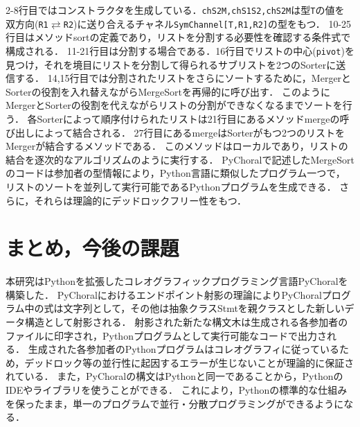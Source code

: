 \documentclass{thesis}
\begin{document}
2-8行目ではコンストラクタを生成している．\texttt{chS2M,chS1S2,chS2M}は型\texttt{T}の値を
双方向(\texttt{R1}$\rightleftarrows$\texttt{R2})に送り合えるチャネル\texttt{SymChannel[T,R1,R2]}の型をもつ．
10-25行目はメソッド\textsf{sort}の定義であり，リストを分割する必要性を確認する条件式で構成される．
11-21行目は分割する場合である．16行目でリストの中心(\texttt{pivot})を見つけ，それを境目にリストを分割して得られるサブリストを2つのSorterに送信する．
14,15行目では分割されたリストをさらにソートするために，MergerとSorterの役割を入れ替えながらMergeSortを再帰的に呼び出す．
このようにMergerとSorterの役割を代えながらリストの分割ができなくなるまでソートを行う．
各Sorterによって順序付けられたリストは21行目にあるメソッド\textsf{merge}の呼び出しによって結合される．
27行目にある\textsf{merge}はSorterがもつ2つのリストをMergerが結合するメソッドである．
このメソッドはローカルであり，リストの結合を逐次的なアルゴリズムのように実行する．
PyChoralで記述したMergeSortのコードは参加者の型情報により，Python言語に類似したプログラム一つで，リストのソートを並列して実行可能であるPythonプログラムを生成できる．
さらに，それらは理論的にデッドロックフリー性をもつ．

%
    

\chapter{まとめ，今後の課題}
本研究はPythonを拡張したコレオグラフィックプログラミング言語PyChoralを構築した．
PyChoralにおけるエンドポイント射影の理論によりPyChoralプログラム中の式は文字列として，その他は抽象クラス\textsf{Stmt}を親クラスとした新しいデータ構造として射影される．
射影された新たな構文木は生成される各参加者のファイルに印字され，Pythonプログラムとして実行可能なコードで出力される．
生成された各参加者のPythonプログラムはコレオグラフィに従っているため，デッドロック等の並行性に起因するエラーが生じないことが理論的に保証されている．
また，PyChoralの構文はPythonと同一であることから，PythonのIDEやライブラリを使うことができる．
これにより，Pythonの標準的な仕組みを保ったまま，単一のプログラムで並行・分散プログラミングができるようになる．
\end{document}
